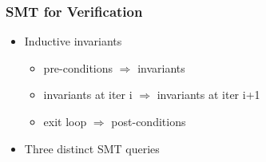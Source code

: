
\begin{frame}

\frametitle{SMT for Verification}

\begin{itemize}

\item<1-> Inductive invariants

\begin{itemize}

\item pre-conditions $\Rightarrow$ invariants

\item invariants at iter i $\Rightarrow$ invariants at iter i+1

\item exit loop $\Rightarrow$ post-conditions

\end{itemize}

\item<2-> Three distinct SMT queries


\end{itemize}
\end{frame}
